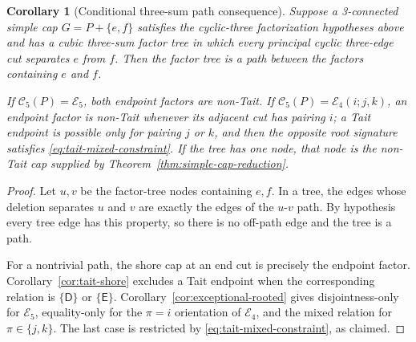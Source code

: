 \documentclass[11pt]{article}
\newtheorem{corollary}[theorem]{Corollary}
\theoremstyle{definition}
\theoremstyle{remark}
\begin{document}
\begin{corollary}[Conditional three-sum path consequence]
\label{cor:tait-path}
Suppose a 3-connected simple cap \(G=P+\{e,f\}\) satisfies the
cyclic-three factorization hypotheses above and has a cubic
three-sum factor tree in which every principal cyclic three-edge cut
separates \(e\) from \(f\).  Then the factor tree is a path between
the factors containing \(e\) and \(f\).

If \(\mathcal C_5(P)=\mathcal E_5\), both endpoint factors are
non-Tait.  If
\(\mathcal C_5(P)=\mathcal E_4(i;j,k)\), an endpoint factor is
non-Tait whenever its adjacent cut has pairing \(i\); a Tait endpoint
is possible only for pairing \(j\) or \(k\), and then the opposite
root signature satisfies \eqref{eq:tait-mixed-constraint}.  If the tree has one node,
that node is the non-Tait cap supplied by
Theorem~\ref{thm:simple-cap-reduction}.
\end{corollary}

\begin{proof}
Let \(u,v\) be the factor-tree nodes containing \(e,f\).  In a tree,
the edges whose deletion separates \(u\) and \(v\) are exactly the
edges of the \(u\)-\(v\) path.  By hypothesis every tree edge has this
property, so there is no off-path edge and the tree is a path.

For a nontrivial path, the shore cap at an end cut is precisely the
endpoint factor.  Corollary~\ref{cor:tait-shore} excludes a Tait
endpoint when the corresponding relation is
\(\{\mathsf D\}\) or \(\{\mathsf E\}\).
Corollary~\ref{cor:exceptional-rooted} gives disjointness-only for
\(\mathcal E_5\), equality-only for the \(\pi=i\) orientation of
\(\mathcal E_4\), and the mixed relation for
\(\pi\in\{j,k\}\).  The last case is restricted by
\eqref{eq:tait-mixed-constraint}, as claimed.
\end{proof}
\end{document}
